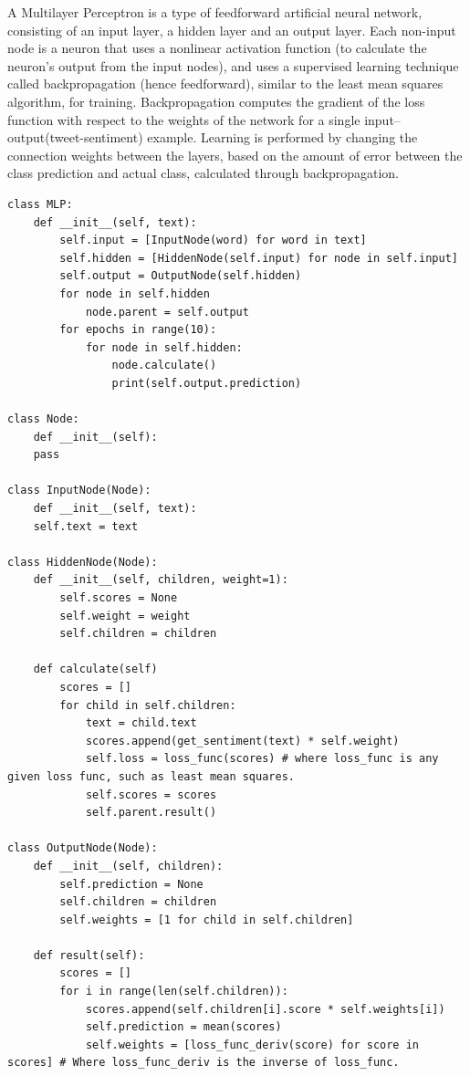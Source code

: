 \documentclass{article}
\begin{document}
A Multilayer Perceptron is a type of feedforward artificial neural network, consisting of an input layer, a hidden layer and an output layer.
Each non-input node is a neuron that uses a nonlinear activation function (to calculate the neuron's output from the input nodes), and uses a supervised learning technique called backpropagation (hence feedforward), similar to the least mean squares algorithm, for training.
Backpropagation computes the gradient of the loss function with respect to the weights of the network for a single input–output(tweet-sentiment) example.
Learning is performed by changing the connection weights between the layers, based on the amount of error between the class prediction and actual class, calculated through backpropagation.

\begin{lstlisting}[caption={Multilayer Perceptron classifier psuedopythoncode},captionpos=b]
class MLP:
	def __init__(self, text):
		self.input = [InputNode(word) for word in text]
		self.hidden = [HiddenNode(self.input) for node in self.input]
		self.output = OutputNode(self.hidden)
		for node in self.hidden
			node.parent = self.output
		for epochs in range(10):
			for node in self.hidden:
				node.calculate()
				print(self.output.prediction)

class Node:
	def __init__(self):
	pass

class InputNode(Node):
	def __init__(self, text):
	self.text = text

class HiddenNode(Node):
	def __init__(self, children, weight=1):
		self.scores = None
		self.weight = weight
		self.children = children

	def calculate(self)
		scores = []
		for child in self.children:
			text = child.text
			scores.append(get_sentiment(text) * self.weight)
			self.loss = loss_func(scores) # where loss_func is any given loss func, such as least mean squares.
			self.scores = scores
			self.parent.result()

class OutputNode(Node):
	def __init__(self, children):
		self.prediction = None
		self.children = children
		self.weights = [1 for child in self.children]

	def result(self):
		scores = []
		for i in range(len(self.children)):
			scores.append(self.children[i].score * self.weights[i])
			self.prediction = mean(scores)
			self.weights = [loss_func_deriv(score) for score in scores] # Where loss_func_deriv is the inverse of loss_func.
\end{lstlisting}
\end{document}
